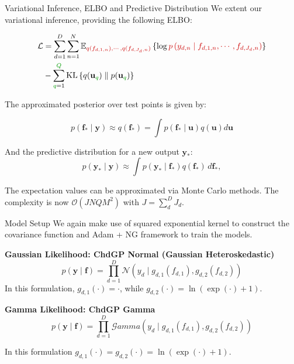 \begin{frame}{Variational Inference, ELBO and Predictive Distribution}
	We extent our variational inference, providing the following ELBO:
	
\begin{equation*}
	\begin{split}
	\mathcal{L} &= \sum_{d=1}^D \sum_{n=1}^{N} \mathbb{E}_{\textcolor{myred}{q(f_{d,1,n}), \cdots, q(f_{d,J_d,n})}} 
	\left\{ \log \textcolor{myred}{p\left( y_{d,n} \mid f_{d,1,n}, \cdots, f_{d,J_d,n} \right)} \right\} \\
	&- \sum_{{\textcolor{mygreen}{q}}=1}^{\textcolor{mygreen}{Q}} \text{KL}\left\{ q(\mathbf{u}_{\textcolor{mygreen}{q}}) \parallel p(\mathbf{u}_{\textcolor{mygreen}{q}}) \right\}
	\end{split}
\end{equation*}

The approximated posterior over test points is given by:

\begin{equation*}
	p(\mathbf{f}_* \mid \mathbf{y}) \approx q(\mathbf{f}_*) = \int p(\mathbf{f}_* \mid \mathbf{u}) q(\mathbf{u}) d\mathbf{u}
\end{equation*}

And the predictive distribution for a new output $\mathbf{y}_*$:
\begin{equation*}
	p(\mathbf{y}_* \mid \mathbf{y}) \approx \int p(\mathbf{y}_* \mid \mathbf{f}_*) q(\mathbf{f}_*) \, d\mathbf{f}_*,
\end{equation*}

The expectation values can be approximated via Monte Carlo methods. The complexity is now \textcolor{mygreen}{$\mathcal{O}(JNQM^2)$} with $J=\sum_d^D J_d$.
	
\end{frame}

\begin{frame}{Model Setup}
	We again make use of squared exponential kernel to construct the covariance function and Adam + NG framework to train the models.
		
	\begin{block}{\textbf{Gaussian Likelihood: ChdGP Normal (Gaussian Heteroskedastic)}}
		\begin{equation*}
			p(\mathbf{y} \mid \mathbf{f}) = \prod_{d=1}^{D} \mathcal{N}\left(y_{d}\mid g_{d,1}(f_{d,1}), g_{d,2}(f_{d,2}) \right)
		\end{equation*}
		In this formulation, \(g_{d,1}(\cdot) = \cdot\), while \(g_{d,2}(\cdot) = \ln(\exp(\cdot) + 1)\).
	\end{block} 
	
	\begin{block}{\textbf{Gamma Likelihood: ChdGP Gamma}}
		\begin{equation*}
		p(\mathbf{y} \mid \mathbf{f}) = \prod_{d=1}^{D} \mathcal{G}amma\left( y_{d} \mid g_{d,1}(f_{d,1}), g_{d,2}(f_{d,2}) \right)
		\end{equation*}
		
		In this formulation \(g_{d,1}(\cdot) = g_{d,2}(\cdot) = \ln(\exp(\cdot) + 1)\).
	\end{block}
		
\end{frame}

